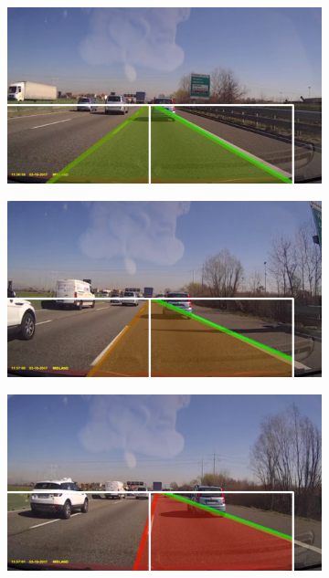 \documentclass[12pt]{article}
\begin{document}
\begin{figure}[htbp]
\centering
    \begin{subfigure}[b]{0.24\textwidth}
        \includegraphics[width=\textwidth]{cross_1.png}
    \end{subfigure}
    \begin{subfigure}[b]{0.24\textwidth}
        \includegraphics[width=\textwidth]{cross_2.png}
    \end{subfigure}
    \begin{subfigure}[b]{0.24\textwidth}
        \includegraphics[width=\textwidth]{cross_3.png}

\end{subfigure}
\end{figure}
\end{document}
